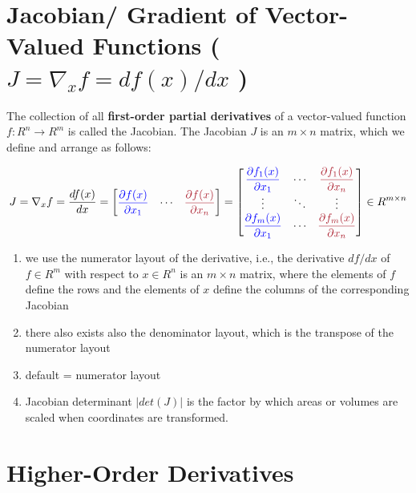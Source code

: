 \section{Jacobian/ Gradient of Vector-Valued Functions ( $J = \nabla_x f = df(x)/dx$ )}\label{Jacobian/ Gradient of Vector-Valued Functions}

The collection of all \textbf{first-order partial derivatives} of a vector-valued function $f : R^n \to R^m$ is called the Jacobian. The Jacobian $J$ is an $m \times n$ matrix, which we define and arrange as follows:

\[
    J = \nabla_x f =
    \dfrac{df(x)}{dx} =
    \begin{bmatrix}
        \textcolor{blue}{\dfrac{\partial f(x)}{\partial x_1}} &
        \cdots &
        \textcolor{Maroon}{\dfrac{\partial f(x)}{\partial x_n}}
    \end{bmatrix} =
    \begin{bmatrix}
        \textcolor{blue}{\dfrac{\partial f_1(x)}{\partial x_1}} &
        \cdots &
        \textcolor{Maroon}{\dfrac{\partial f_1(x)}{\partial x_n}}\\
        \vdots & \ddots & \vdots \\
        \textcolor{blue}{\dfrac{\partial f_m(x)}{\partial x_1}} &
        \cdots &
        \textcolor{Maroon}{\dfrac{\partial f_m(x)}{\partial x_n}}\\
    \end{bmatrix}
    \in R^{m\times n}
\]

\begin{enumerate}
    \item we use the numerator layout of the derivative, i.e., the derivative $df/dx$ of $f \in R^m$ with respect to $x \in R^n$ is an $m \times n$ matrix, where the elements of $f$ define the rows and the elements of $x$ define the columns of the corresponding Jacobian

    \item there also exists also the denominator layout, which is the transpose of the numerator layout

    \item default = numerator layout

    \item Jacobian determinant $|det(J)|$ is the factor by which areas or volumes are scaled when coordinates are transformed.
\end{enumerate}


\section{Higher-Order Derivatives}\label{Higher-Order Derivatives}

